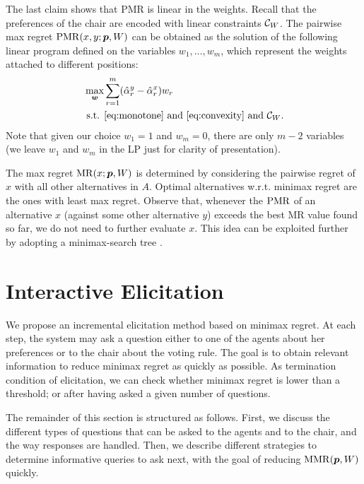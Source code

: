 \documentclass[sigconf, anonymous]{aamas}
\begin{document}
The last claim shows that PMR is linear in the weights.
Recall that the preferences of the chair are encoded with linear constraints $\mathcal{C}_{W}$.
The pairwise max regret $\operatorname{PMR}(x,y; {\bm{p}},W)$ can be obtained as the solution of the following linear program defined on the variables $w_1, …, w_m$, which represent the weights attached to different positions:
\begin{align}
	\max_{\w} & \sum_{r=1}^m (\hat{\alpha}_{r}^{y} - \hat{\alpha}_{r}^{x}) w_{r}\\
	\text{ s.t. } & \text{\cref{eq:monotone}} \text{ and } \text{\cref{eq:convexity}} \text{ and } \Co_W.
\end{align}
Note that given our choice $w_{1}=1$ and $w_{m}=0$, there are only $m-2$ variables 
(we leave $w_{1}$ and $w_{m}$ in the LP just for clarity of presentation).

The max regret $\operatorname{MR}(x; {\bm{p}}, W)$ is determined by considering the pairwise regret of $x$ with all other alternatives in $A$.
Optimal alternatives w.r.t. minimax regret are the ones with least max regret. 
Observe that, whenever the $\operatorname{PMR}$ of an alternative $x$ (against some other alternative $y$) exceeds the best MR value found so far, we do not need to further evaluate $x$. 
This idea can be exploited further by adopting a minimax-search tree \citep{Braziunas2011}.

\section{Interactive Elicitation} 
\label{sec:elicit}
We propose an incremental elicitation method based on minimax regret.
At each step, the system may ask a question either to one of the agents about her preferences or to the chair about the voting rule. 
The goal is to obtain relevant information to reduce minimax regret as quickly as possible.
As termination condition of elicitation, we can check whether minimax regret is lower than a threshold; or after having asked a given number of questions.

The remainder of this section is structured as follows.
First, we discuss the different types of questions that can be asked to the agents and to the chair, and the way responses are handled.
Then, we describe different strategies to determine informative queries to ask next, with the goal of reducing $\operatorname{MMR}({\bm{p}},W)$ quickly.
\end{document}
